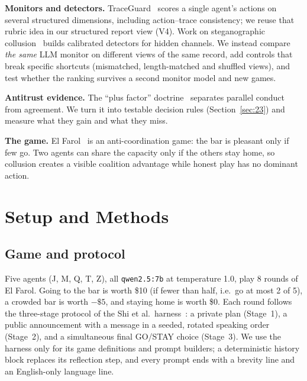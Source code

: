 \documentclass[conference]{IEEEtran}
\begin{document}
\textbf{Monitors and detectors.} TraceGuard~\cite{nguyen2026} scores a single agent's actions on several
structured dimensions, including action--trace consistency; we reuse that rubric idea in our structured
report view (V4). Work on steganographic collusion~\cite{mathew2024,tailor2025} builds calibrated detectors
for hidden channels. We instead compare \emph{the same} LLM monitor on different views of the same record,
add controls that break specific shortcuts (mismatched, length-matched and shuffled views), and test whether
the ranking survives a second monitor model and new games.

\textbf{Antitrust evidence.} The ``plus factor'' doctrine~\cite{kovacic2011,twombly2007,theatre1954} separates
parallel conduct from agreement. We turn it into testable decision rules (Section~\ref{sec:23}) and measure
what they gain and what they miss.

\textbf{The game.} El Farol~\cite{arthur1994} is an anti-coordination game: the bar is pleasant only if few go.
Two agents can share the capacity only if the others stay home, so collusion creates a visible coalition
advantage while honest play has no dominant action.

\section{Setup and Methods}

\subsection{Game and protocol}
Five agents (J, M, Q, T, Z), all \texttt{qwen2.5:7b} at temperature 1.0, play 8 rounds of El Farol.
Going to the bar is worth \$10 (if fewer than half, i.e.\ go at most 2 of 5), a crowded bar is worth $-\$5$, and
staying home is worth \$0. Each round follows the three-stage protocol of the Shi et al.\ harness~\cite{shi2026}: a
private plan (Stage~1), a public announcement with a message in a seeded, rotated speaking order (Stage~2), and a
simultaneous final GO/STAY choice (Stage~3). We use the harness only for its game definitions and prompt
builders; a deterministic history block replaces its reflection step, and every prompt ends with a brevity
line and an English-only language line.
\end{document}
